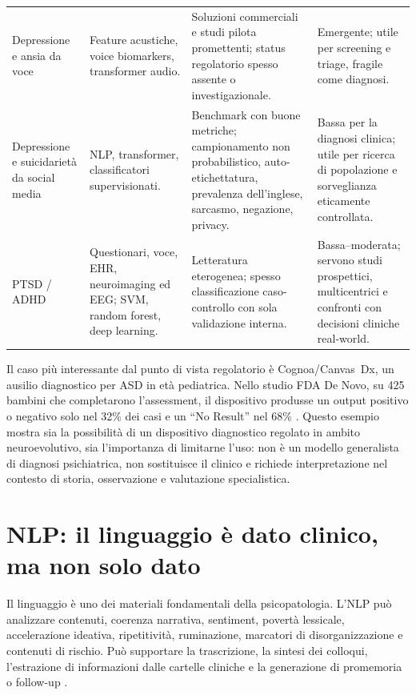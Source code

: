 \documentclass[11pt,a4paper]{article}
\begin{document}
\begin{longtable}{>{\RaggedRight}p{2.5cm} >{\RaggedRight}p{3.6cm} >{\RaggedRight}p{4.0cm} >{\RaggedRight}p{3.5cm}}
\addlinespace
\small Depressione e ansia da voce & \small Feature acustiche, voice biomarkers, transformer audio. & \small Soluzioni commerciali e studi pilota promettenti; status regolatorio spesso assente o investigazionale. & \small Emergente; utile per screening e triage, fragile come diagnosi. \\
\addlinespace
\small Depressione e suicidarietà da social media & \small NLP, transformer, classificatori supervisionati. & \small Benchmark con buone metriche; campionamento non probabilistico, auto-etichettatura, prevalenza dell'inglese, sarcasmo, negazione, privacy. & \small Bassa per la diagnosi clinica; utile per ricerca di popolazione e sorveglianza eticamente controllata. \\
\addlinespace
\small PTSD / ADHD & \small Questionari, voce, EHR, neuroimaging ed EEG; SVM, random forest, deep learning. & \small Letteratura eterogenea; spesso classificazione caso-controllo con sola validazione interna. & \small Bassa--moderata; servono studi prospettici, multicentrici e confronti con decisioni cliniche real-world. \\
\end{longtable}

Il caso più interessante dal punto di vista regolatorio è Cognoa/Canvas~Dx, un ausilio diagnostico per ASD in età pediatrica. Nello studio FDA De Novo, su 425 bambini che completarono l'assessment, il dispositivo produsse un output positivo o negativo solo nel 32\% dei casi e un ``No Result'' nel 68\% \cite{fda-cognoa}. Questo esempio mostra sia la possibilità di un dispositivo diagnostico regolato in ambito neuroevolutivo, sia l'importanza di limitarne l'uso: non è un modello generalista di diagnosi psichiatrica, non sostituisce il clinico e richiede interpretazione nel contesto di storia, osservazione e valutazione specialistica.

\section{NLP: il linguaggio è dato clinico, ma non solo dato}
\label{sec:nlp}

Il linguaggio è uno dei materiali fondamentali della psicopatologia. L'NLP può analizzare contenuti, coerenza narrativa, sentiment, povertà lessicale, accelerazione ideativa, ripetitività, ruminazione, marcatori di disorganizzazione e contenuti di rischio. Può supportare la trascrizione, la sintesi dei colloqui, l'estrazione di informazioni dalle cartelle cliniche e la generazione di promemoria o follow-up \cite{guo2024,hua2025}.
\end{document}
